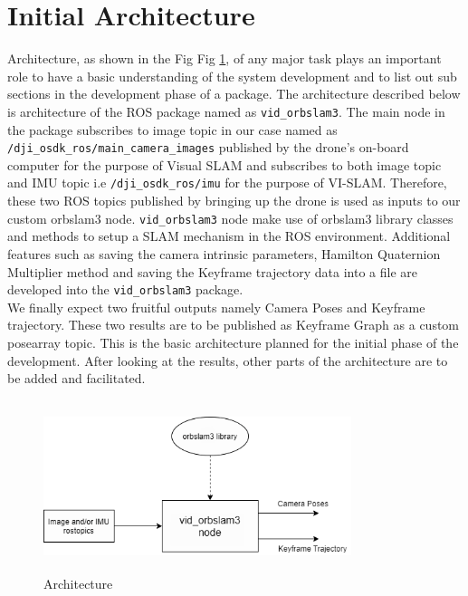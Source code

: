 \section{Initial Architecture}
\label{sec:concept:archi}
Architecture, as shown in the Fig Fig \ref{fig:architecture}, of any major task plays an important role to have a basic understanding of the system development and to list out sub sections in the development phase of a package. The architecture described below is architecture of the ROS package named as \texttt{vid\_orbslam3}. The main node in the package subscribes to image topic in our case named as  \texttt{/dji\_osdk\_ros/main\_camera\_images} published by the drone's on-board computer for the purpose of Visual SLAM and subscribes to both image topic and IMU topic i.e \texttt{/dji\_osdk\_ros/imu} for the purpose of VI-SLAM. Therefore, these two ROS topics published by bringing up the drone is used as inputs to our custom orbslam3 node. \texttt{vid\_orbslam3} node make use of orbslam3 library classes and methods to setup a SLAM mechanism in the ROS environment. Additional features such as saving the camera intrinsic parameters, Hamilton Quaternion Multiplier method and saving the Keyframe trajectory data into a file are developed into the \texttt{vid\_orbslam3} package. \\

We finally expect two fruitful outputs namely Camera Poses and Keyframe trajectory. These two results are to be published as Keyframe Graph as a custom posearray topic. This is the basic architecture planned for the initial phase of the development. After looking at the results, other parts of the architecture are to be added and facilitated. 

\begin{figure}
    \centering
    \includegraphics[height=5cm, width=9cm]{Images/archi.png}
    \caption{Architecture}
    \label{fig:architecture}
\end{figure}

